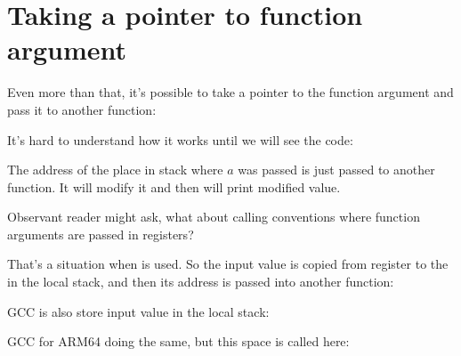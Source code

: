 \ifdefined\RUSSIAN
\else
\section{Taking a pointer to function argument}

Even more than that, it's possible to take a pointer to the function argument and pass
it to another function:



It's hard to understand how it works until we will see the code:



The address of the place in stack where $a$ was passed is just passed to another function.
It will modify it and then \printf will print modified value.

Observant reader might ask, what about calling conventions where function arguments are
passed in registers?

That's a situation when  is used. 
So the input value is copied from register
to the  in the local stack, and then its address is passed into another function:



GCC is also store input value in the local stack:



GCC for ARM64 doing the same, but this space is called  here:


\fi
